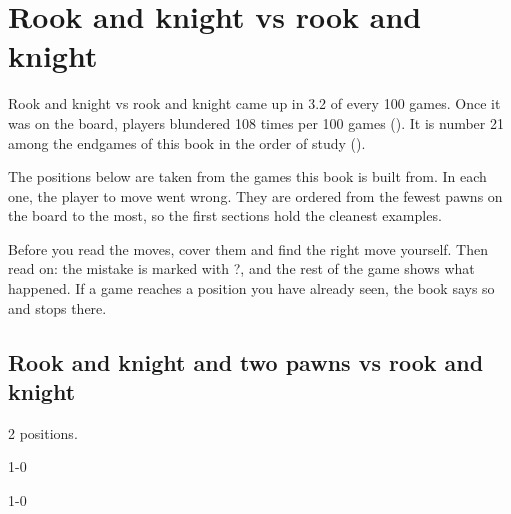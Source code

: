 \chapter{Rook and knight vs rook and knight}\label{ch:rook-and-knight-vs-rook-and-knight}
Rook and knight vs rook and knight came up in 3.2 of every 100 games. Once it was on the board, players blundered 108 times per 100 games (). It is number 21 among the endgames of this book in the order of study ().

The positions below are taken from the games this book is built from. In each one, the player to move went wrong. They are ordered from the fewest pawns on the board to the most, so the first sections hold the cleanest examples.

Before you read the moves, cover them and find the right move yourself. Then read on: the mistake is marked with ?, and the rest of the game shows what happened. If a game reaches a position you have already seen, the book says so and stops there.


\section{Rook and knight and two pawns vs rook and knight}
2 positions.


1-0\par
{}

1-0\par
